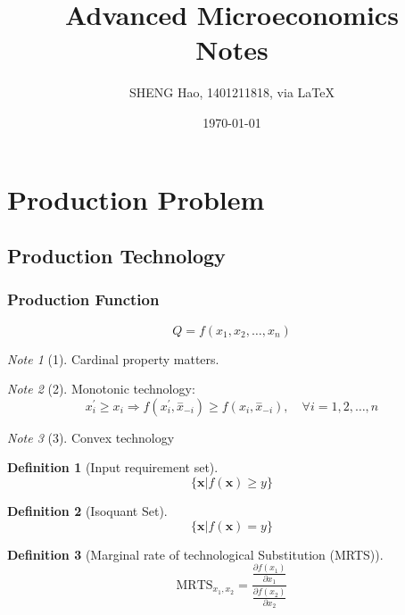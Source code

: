 \documentclass{article}
\theoremstyle{plain}
\theoremstyle{definition}
\newtheorem{defn}{Definition}[section]
\theoremstyle{remark}
\newtheorem*{note}{Note}
\begin{document}
\title{Advanced Microeconomics\\Notes}
\author{{\normalsize SHENG Hao, 1401211818, via \LaTeX}}
\date{\today}

\maketitle

\def \Pr{{\rm Pr}}
\baselineskip 0.6cm
\tableofcontents
\newpage
\section{Production Problem}
\subsection{Production Technology}
\subsubsection{Production Function}
\begin{equation}
	Q = f(x_1,x_2,\dots,x_n)
\end{equation}
\begin{note}[1]
Cardinal property matters.
\end{note}
\begin{note}[2]
Monotonic technology:
\begin{equation}
	x^{'}_i\geq x_i \Rightarrow f(x^{'}_i, \overset{-}x_{-i})\geq f(x_i, \overset{-}x_{-i}), \quad \forall i = 1, 2, \dots, n
\end{equation}
\end{note}
\begin{note}[3]
Convex technology 
\end{note}

\begin{defn}[Input requirement set]
\begin{equation}
	\{ \bm{x}|f(\bm{x}) \geq y \}
\end{equation}
\end{defn}

\begin{defn}[Isoquant Set]
\begin{equation}
	\{ \bm{x}|f(\bm{x}) = y \}
\end{equation}
\end{defn}

\begin{defn}[Marginal rate of technological Substitution (MRTS)]
\begin{equation}
	\text{MRTS}_{x_1,x_2}=\frac{\frac{\partial f(x_1)}{\partial x_1}}{\frac{\partial f(x_2)}{\partial x_2}}
\end{equation}
\end{defn}
\end{document}
